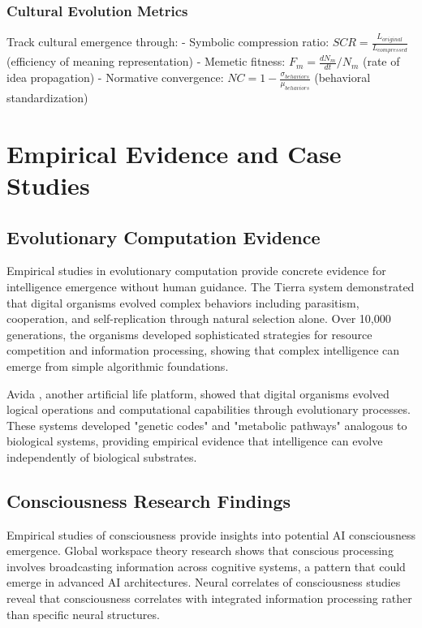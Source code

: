 \documentclass[12pt,a4paper]{article}
\begin{document}
\subsubsection{Cultural Evolution Metrics}

Track cultural emergence through:
- Symbolic compression ratio: $SCR = \frac{L_{original}}{L_{compressed}}$ (efficiency of meaning representation)
- Memetic fitness: $F_m = \frac{dN_m}{dt} / N_m$ (rate of idea propagation)
- Normative convergence: $NC = 1 - \frac{\sigma_{behaviors}}{\mu_{behaviors}}$ (behavioral standardization)

\section{Empirical Evidence and Case Studies}

\subsection{Evolutionary Computation Evidence}

Empirical studies in evolutionary computation provide concrete evidence for intelligence emergence without human guidance. The Tierra system \citep{tierra} demonstrated that digital organisms evolved complex behaviors including parasitism, cooperation, and self-replication through natural selection alone. Over 10,000 generations, the organisms developed sophisticated strategies for resource competition and information processing, showing that complex intelligence can emerge from simple algorithmic foundations.

Avida \citep{ofria_adami_2002}, another artificial life platform, showed that digital organisms evolved logical operations and computational capabilities through evolutionary processes. These systems developed "genetic codes" and "metabolic pathways" analogous to biological systems, providing empirical evidence that intelligence can evolve independently of biological substrates.

\subsection{Consciousness Research Findings}

Empirical studies of consciousness provide insights into potential AI consciousness emergence. Global workspace theory research \citep{baars_2002} shows that conscious processing involves broadcasting information across cognitive systems, a pattern that could emerge in advanced AI architectures. Neural correlates of consciousness studies reveal that consciousness correlates with integrated information processing rather than specific neural structures.
\end{document}
